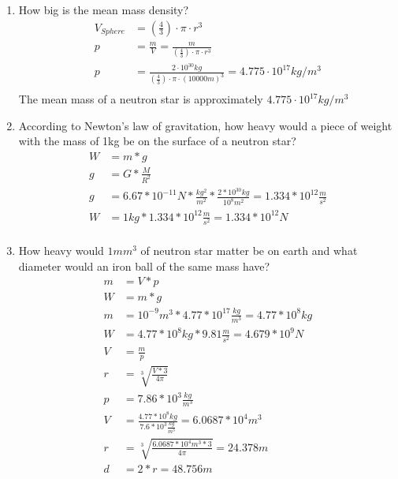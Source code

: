 \documentclass[10pt,ngerman]{scrartcl}
\begin{document}
\begin{enumerate}
	\item How big is the mean mass density?
	\begin{align*}
		V_{Sphere} &= (\frac{4}{3}) \cdot \pi \cdot r^3\\
		p &= \frac{m}{V} = \frac{m}{(\frac{4}{3}) \cdot \pi \cdot r^3}\\
		p &= \frac{2 \cdot 10^{30}kg}{(\frac{4}{3}) \cdot \pi \cdot (10000m)^3} = 4.775 \cdot 10^{17} kg/m^3 \\
	\end{align*}
	The mean mass of a neutron star is approximately $4.775 \cdot 10^{17} kg/m^3$ \newline
	
	\item According to Newton's law of gravitation, how heavy would a piece of weight with the mass of 1kg be on the surface of a neutron star?
	\begin{align*}
		W &= m * g \\
		g &= G * \frac{M}{R^{2}} \\
		g &= 6.67 * 10^{-11} N * \frac{kg^{2}}{m^{2}} * \frac{2*10^{30} kg}{10^{8} m^{2}} = 1.334 * 10^{12} \frac{m}{s^{2}} \\
		W &= 1kg * 1.334 * 10^{12} \frac{m}{s^{2}} = 1.334 * 10^{12} N \\
	\end{align*}
	\newpage
	\item How heavy would $1mm^3$ of neutron star matter be on earth and what diameter would an iron ball of the same mass have?
	\begin{align*}
		m &= V * p \\
		W &= m * g \\
		m &= 10^{-9} m^{3} * 4.77 * 10^{17} \frac{kg}{m^{3}} = 4.77 * 10^{8} kg \\
		W &= 4.77 * 10^{8} kg * 9.81 \frac{m}{s^{2}} = 4.679 * 10^{9} N \\
		V &= \frac{m}{p} \\
		r &= \sqrt[3]{\frac{V * 3}{4\pi}} \\
		p &= 7.86 * 10^{3} \frac{kg}{m^{3}} \\
		V &= \frac{4.77 * 10^{8} kg}{7.6 * 10^{3} \frac{kg}{m^{3}}} = 6.0687 * 10^{4} m^{3} \\
		r &= \sqrt[3]{\frac{6.0687 * 10^{4} m^{3} * 3}{4\pi}} = 24.378 m \\
		d &= 2 * r = 48.756 m \\
	\end{align*}
\end{enumerate}
\end{document}
